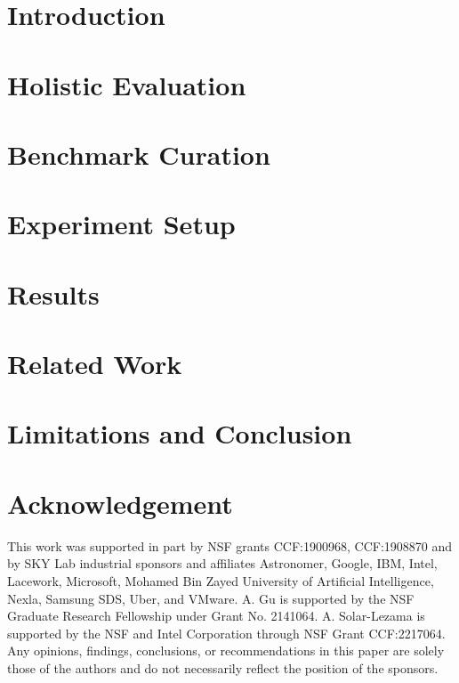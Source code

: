\documentclass{article} %
\begin{document}
\vspace{-3pt}
\section{Introduction}
\label{sec:introduction}




\vspace{-3pt}
\section{Holistic Evaluation}
\label{sec:tasks}


\vspace{-3pt}
\section{Benchmark Curation}
\label{sec:benchmark}


\vspace{-3pt}
\section{Experiment Setup}
\label{sec:setup}


\vspace{-3pt}
\section{Results}
\label{sec:results}


\vspace{-3pt}
\section{Related Work}
\label{sec:related-work}


\vspace{-3pt}
\section{Limitations and Conclusion}
\label{sec:limitations}




\section*{Acknowledgement}
This work was supported in part by NSF grants CCF:1900968, CCF:1908870 and by SKY Lab industrial sponsors and affiliates Astronomer, Google, IBM, Intel, Lacework, Microsoft, Mohamed Bin Zayed University of Artificial Intelligence, Nexla, Samsung SDS, Uber, and VMware. 
A. Gu is supported by the NSF Graduate Research Fellowship under Grant No. 2141064. 
A. Solar-Lezama is supported by the NSF and Intel Corporation through NSF Grant CCF:2217064.
Any opinions, findings, conclusions, or recommendations in this paper are solely those of the authors and do not necessarily reflect the position of the sponsors. 
\end{document}
